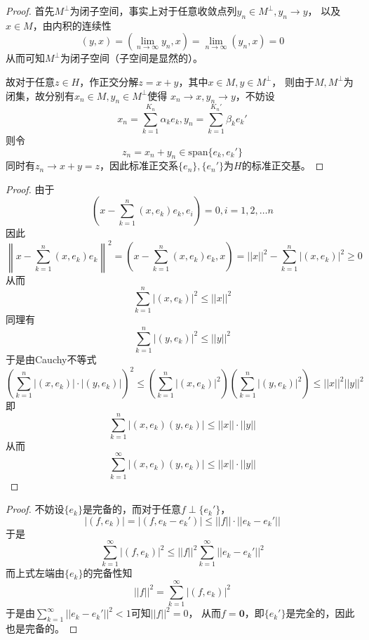 \documentclass[cn]{homework}
\begin{document}
    \problem
    \begin{proof}
        首先$M^\perp$为闭子空间，事实上对于任意收敛点列$y_n\in M^\perp,y_n\to y$，
        以及$x\in M$，由内积的连续性
        \[(y,x)=\left(\lim_{n\to\infty}y_n,x\right)
        =\lim_{n\to\infty}(y_n,x)=0\]
        从而可知$M^\perp$为闭子空间（子空间是显然的）。

        故对于任意$z\in H$，作正交分解$z=x+y$，其中$x\in M,y\in M^\perp$，
        则由于$M,M^\perp$为闭集，故分别有$x_n\in M,y_n\in M^\perp$使得
        $x_n\to x,y_n\to y$，不妨设
        \[x_n=\sum_{k=1}^{K_n}\alpha_ke_k,
        y_n=\sum_{k=1}^{K_n'}\beta_ke_k'\]
        则令
        \[z_n=x_n+y_n\in\mathrm{span}\{e_k,e_k'\}\]
        同时有$z_n\to x+y=z$，因此标准正交系$\{e_n\},\{e_n'\}$为$H$的标准正交基。
    \end{proof}

    \problem
    \begin{proof}
        由于
        \[\left(x-\sum_{k=1}^n(x,e_k)e_k,e_i\right)=0,i=1,2,\ldots n\]
        因此
        \[\left\|x-\sum_{k=1}^n(x,e_k)e_k\right\|^2
        =\left(x-\sum_{k=1}^n(x,e_k)e_k,x\right)
        =||x||^2-\sum_{k=1}^n|(x,e_k)|^2\geq 0\]
        从而
        \[\sum_{k=1}^n|(x,e_k)|^2\leq ||x||^2\]
        同理有
        \[\sum_{k=1}^n|(y,e_k)|^2\leq ||y||^2\]
        于是由Cauchy不等式
        \[\left(\sum_{k=1}^n|(x,e_k)|\cdot|(y,e_k)|\right)^2
        \leq
        \left(\sum_{k=1}^n|(x,e_k)|^2\right)
        \left(\sum_{k=1}^n|(y,e_k)|^2\right)
        \leq ||x||^2||y||^2\]
        即
        \[\sum_{k=1}^n|(x,e_k)(y,e_k)|\leq
        ||x||\cdot||y||\]
        从而
        \[\sum_{k=1}^\infty|(x,e_k)(y,e_k)|\leq ||x||\cdot||y||\]


    \end{proof}

    \problem
    \begin{proof}
        不妨设$\{e_k\}$是完备的，而对于任意$f\perp\{e_k'\}$，
        \[|(f,e_k)|=|(f,e_k-e_k')|\leq||f||\cdot||e_k-e_k'||\]
        于是
        \[\sum_{k=1}^\infty |(f,e_k)|^2
        \leq||f||^2\sum_{k=1}^\infty||e_k-e_k'||^2\]
        而上式左端由$\{e_k\}$的完备性知
        \[||f||^2=\sum_{k=1}^\infty|(f,e_k)|^2\]
        于是由$\sum_{k=1}^\infty||e_k-e_k'||^2<1$可知$||f||^2=0$，
        从而$f=\boldsymbol 0$，即$\{e_k'\}$是完全的，因此也是完备的。
    \end{proof}
\end{document}
